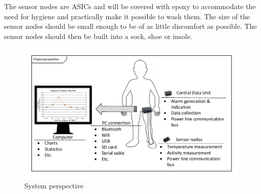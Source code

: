 The sensor nodes are ASICs and will be covered with epoxy to accommodate the need for hygiene and practically make it possible to wash them. The size of the sensor nodes should be small enough to be of as little discomfort as possible. The sensor nodes should then be built into a sock, shoe or insole.
\begin{figure}[H]
	\centering
	\includegraphics[width=.9\textwidth]{billeder/6Systemdescription/fullsystem_vector}
	\caption{System perspective}
	\label{fig:full_system}
\end{figure}
